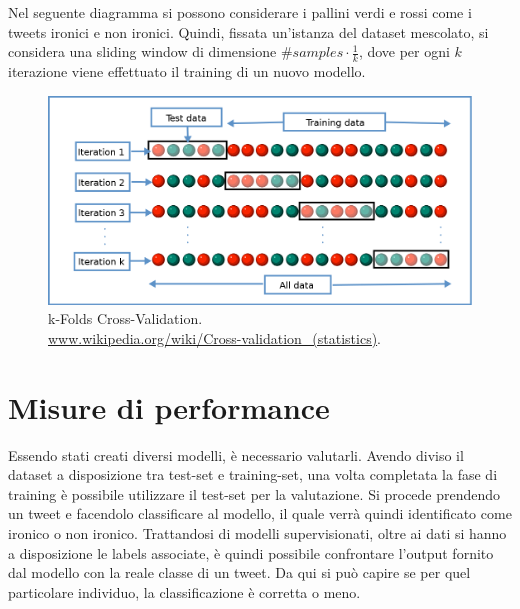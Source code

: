 \documentclass[oneside]{book}
\begin{document}
Nel seguente diagramma si possono considerare i pallini verdi e rossi come i tweets ironici e non ironici. Quindi, fissata un'istanza del dataset mescolato, si considera una sliding window di dimensione $\#samples \cdot \frac{1}{k}$, dove per ogni $k$ iterazione viene effettuato il training di un nuovo modello.

\begin{figure}[!h]
	\centering
	\includegraphics[width=13cm]{assets/cross-validation.png}
	\caption{k-Folds Cross-Validation. \\ \url{www.wikipedia.org/wiki/Cross-validation_(statistics)}.}
	\label{fig:cross-validation}
\end{figure}


\section{Misure di performance}
Essendo stati creati diversi modelli, è necessario valutarli. Avendo diviso il dataset a disposizione tra test-set e training-set, una volta completata la fase di training è possibile utilizzare il test-set per la valutazione. Si procede prendendo un tweet e facendolo classificare al modello, il quale verrà quindi identificato come ironico o non ironico. Trattandosi di modelli supervisionati, oltre ai dati si hanno a disposizione le labels associate, è quindi possibile confrontare l'output fornito dal modello con la reale classe di un tweet. Da qui si può capire se per quel particolare individuo, la classificazione è corretta o meno.
\end{document}
